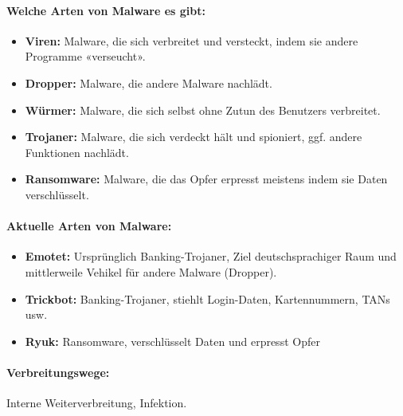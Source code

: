 \documentclass[10pt,a4paper]{article}
\begin{document}
\paragraph*{Welche Arten von Malware es gibt:}
\begin{itemize}[noitemsep,topsep=0pt,leftmargin=*]
    \item \textbf{Viren:} Malware, die sich verbreitet und versteckt, indem sie andere Programme «verseucht».
    \item \textbf{Dropper:} Malware, die andere Malware nachlädt.
    \item \textbf{Würmer:} Malware, die sich selbst ohne Zutun des Benutzers verbreitet.
    \item \textbf{Trojaner:} Malware, die sich verdeckt hält und spioniert, ggf. andere Funktionen nachlädt.
    \item \textbf{Ransomware:} Malware, die das Opfer erpresst meistens indem sie Daten verschlüsselt.
\end{itemize}
\paragraph*{Aktuelle Arten von Malware:}
\begin{itemize}[noitemsep,topsep=0pt,leftmargin=*]
    \item \textbf{Emotet:} Ursprünglich Banking-Trojaner, Ziel deutschsprachiger Raum und mittlerweile Vehikel für andere Malware (Dropper).
    \item \textbf{Trickbot:} Banking-Trojaner, stiehlt Login-Daten, Kartennummern, TANs usw.
    \item \textbf{Ryuk:} Ransomware, verschlüsselt Daten und erpresst Opfer
\end{itemize}
\paragraph*{Verbreitungswege:} Interne Weiterverbreitung, Infektion.
\end{document}
